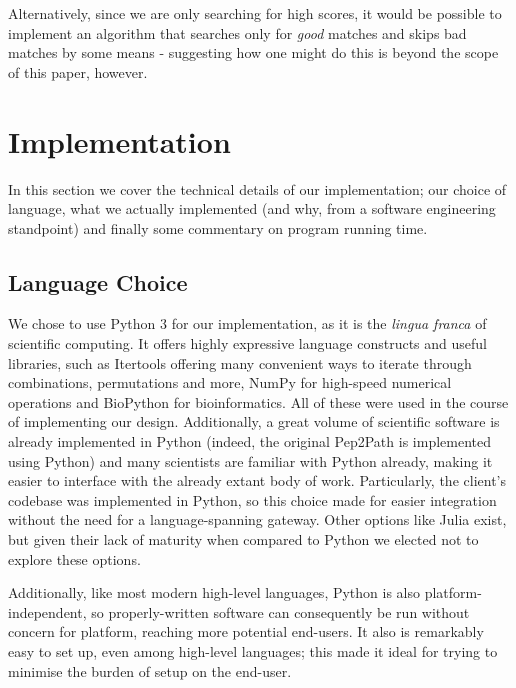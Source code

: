 \documentclass{l4proj}
\newcommand{\cit}[1]{\citep{#1}}
\begin{document}
Alternatively, since we are only searching for high scores, it would be possible to implement an algorithm that searches only for \textit{good} matches and skips bad matches by some means - suggesting how one might do this is beyond the scope of this paper, however. 

\chapter{Implementation}

In this section we cover the technical details of our implementation; our choice of language, what we actually implemented (and why, from a software engineering standpoint) and finally some commentary on program running time.

\section{Language Choice}

We chose to use Python 3 for our implementation, as it is the \textit{lingua franca} of scientific computing. It offers highly expressive language constructs and useful libraries, such as Itertools \cit{itools} offering many convenient ways to iterate through combinations, permutations and more, NumPy \cit{numpy} for high-speed numerical operations and BioPython \cit{biopy} for bioinformatics. All of these were used in the course of implementing our design. Additionally, a great volume of scientific software is already implemented in Python (indeed, the original Pep2Path is implemented using Python) and many scientists are familiar with Python already, making it easier to interface with the already extant body of work. Particularly, the client's codebase was implemented in Python, so this choice made for easier integration without the need for a language-spanning gateway. Other options like Julia \cit{julia} exist, but given their lack of maturity when compared to Python we elected not to explore these options. 

Additionally, like most modern high-level languages, Python is also platform-independent, so properly-written software can consequently be run without concern for platform, reaching more potential end-users. It also is remarkably easy to set up, even among high-level languages; this made it ideal for trying to minimise the burden of setup on the end-user.
\end{document}
